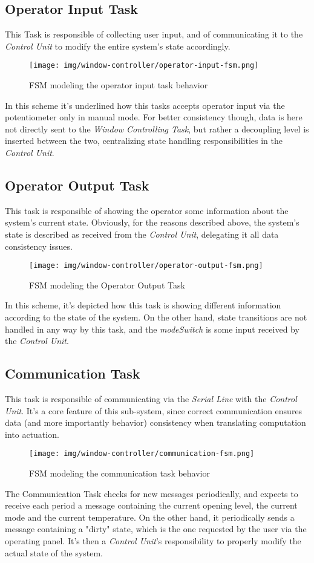 \documentclass[a4paper,12pt]{report}
\begin{document}
		\subsection{Operator Input Task}
		This Task is responsible of collecting user input, and of communicating it to the \textit{Control Unit} to modify the entire system's state accordingly.
		\begin{figure}[H]
			\centering{}
			\texttt{[image: img/window-controller/operator-input-fsm.png]}
			\caption{FSM modeling the operator input task behavior}
			\label{img:window-controller/operator-input-fsm}
		\end{figure}
		In this scheme it's underlined how this tasks accepts operator input via the potentiometer only in manual mode. For better consistency though, data is here not directly sent to the \textit{Window Controlling Task}, but rather a decoupling level is inserted between the two, centralizing state handling responsibilities in the \textit{Control Unit}.
		\subsection{Operator Output Task}
		This task is responsible of showing the operator some information about the system's current state. Obviously, for the reasons described above, the system's state is described as received from the \textit{Control Unit}, delegating it all data consistency issues.
		\begin{figure}[H]
			\centering{}
			\texttt{[image: img/window-controller/operator-output-fsm.png]}
			\caption{FSM modeling the Operator Output Task}
			\label{img:window-controller/operator-output-fsm}
		\end{figure}
		In this scheme, it's depicted how this task is showing different information according to the state of the system. On the other hand, state transitions are not handled in any way by this task, and the \textit{modeSwitch} is some input received by the \textit{Control Unit}.
		\subsection{Communication Task}
		This task is responsible of communicating via the \textit{Serial Line} with the \textit{Control Unit}. It's a core feature of this sub-system, since correct communication ensures data (and more importantly behavior) consistency when translating computation into actuation.
		\begin{figure}[H]
			\centering{}
			\texttt{[image: img/window-controller/communication-fsm.png]}
			\caption{FSM modeling the communication task behavior}
			\label{img:window-controller/communication-fsm}
		\end{figure}
		The Communication Task checks for new messages periodically, and expects to receive each period a message containing the current opening level, the current mode and the current temperature. On the other hand, it periodically sends a message containing a "dirty" state, which is the one requested by the user via the operating panel. It's then a \textit{Control Unit}'s responsibility to properly modify the actual state of the system.
\end{document}
